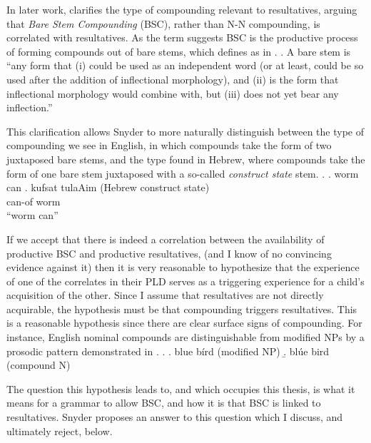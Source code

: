
In later work, \textcite{snyder2016compound} clarifies the type of compounding relevant to resultatives, arguing that \textit{Bare Stem Compounding} (BSC), rather than N-N compounding, is correlated with resultatives.
As the term suggests BSC is the productive process of forming compounds out of bare stems, which \textcite{snyder2016compound} defines as in \Next.
\ex. A bare stem is ``any form that (i) could be used as an independent word (or at least, could be so used after the addition of inflectional morphology), and (ii) is the form that inflectional morphology would combine with, but (iii) does not yet bear any inflection.'' \parencite[90]{snyder2016compound} 

This clarification allows Snyder to more naturally distinguish between the type of compounding we see in English, in which compounds take the form of two juxtaposed bare stems, and the type found in Hebrew, where compounds take the form of one bare stem juxtaposed with a so-called \textit{construct state} stem.
\ex.
\a. worm can 
\bg. kufsat tulaAim {(Hebrew construct state)}\\
can-of worm {}\\
``worm can''\hfill\parencite[338]{snyder2001nature}


If we accept that there is indeed a correlation between the availability of productive BSC and productive resultatives, (and I know of no convincing evidence against it) then it is very reasonable to hypothesize that the experience of one of the correlates in their PLD serves as a triggering experience for a child's acquisition of the other.
Since I assume that resultatives are not directly acquirable, the hypothesis must be that compounding triggers resultatives.
This is a reasonable hypothesis since there are clear surface signs of compounding.
For instance, English nominal compounds are distinguishable from modified NPs by a prosodic pattern demonstrated in \Next.
\ex.
\a. blue b\'ird (modified NP)
\b. bl\'ue bird (compound N)

The question this hypothesis leads to, and which occupies this thesis, is what it means for a grammar to allow BSC, and how it is that BSC is linked to resultatives.
Snyder proposes an answer to this question which I discuss, and ultimately reject, below.

